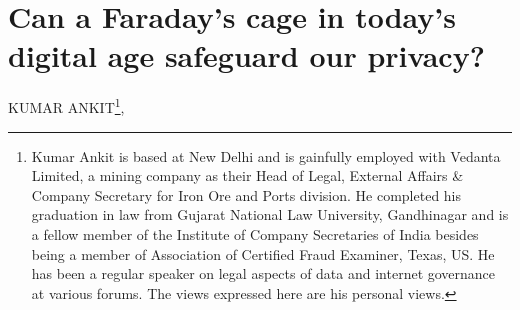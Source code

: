 \chapter{Can a Faraday’s cage in today’s digital age safeguard our privacy?}
\vskip -15pt


\begin{center}
{\large\uppercase{Kumar Ankit}}\footnote{Kumar Ankit is based at New Delhi and is gainfully employed with Vedanta Limited, a mining company as their Head of Legal, External Affairs \& Company Secretary for Iron Ore and Ports division. He completed his graduation in law from Gujarat National Law University, Gandhinagar and is a fellow member of the Institute of Company Secretaries of India besides being a member of Association of Certified Fraud Examiner, Texas, US. He has been a regular speaker on legal aspects of data and internet governance at various forums. The views expressed here are his personal views.}, 


\end{center}

\vskip 2.3cm



\vfill
\newpage

